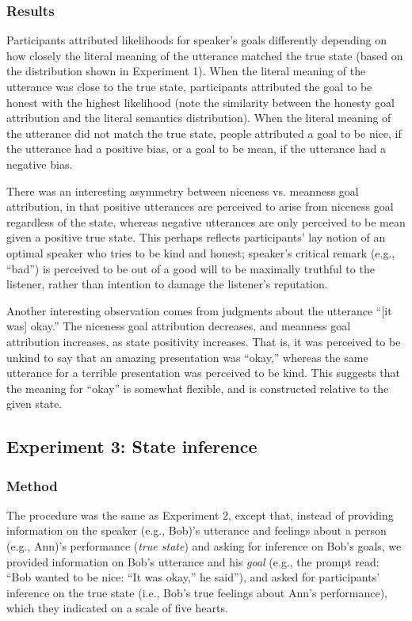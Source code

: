 \documentclass[10pt,letterpaper]{article}
\begin{document}
\subsubsection{Results}

Participants attributed likelihoods for speaker's goals differently depending on how closely the literal meaning of the utterance matched the true state (based on the distribution shown in Experiment 1). When the literal meaning of the utterance was close to the true state, participants attributed the goal to be honest with the highest likelihood (note the similarity between the honesty goal attribution and the literal semantics distribution). When the literal meaning of the utterance did not match the true state, people attributed a goal to be nice, if the utterance had a positive bias, or a goal to be mean, if the utterance had a negative bias.

There was an interesting asymmetry between niceness vs. meanness goal attribution, in that positive utterances are perceived to arise from niceness goal regardless of the state, whereas negative utterances are only perceived to be mean given a positive true state. This perhaps reflects participants' lay notion of an optimal speaker who tries to be kind and honest; speaker's critical remark (e.g., ``bad'') is perceived to be out of a good will to be maximally truthful to the listener, rather than intention to damage the listener's reputation.

Another interesting observation comes from judgments about the utterance ``[it was] okay.'' The niceness goal attribution decreases, and meanness goal attribution increases, as state positivity increases. That is, it was perceived to be unkind to say that an amazing presentation was ``okay,'' whereas the same utterance for a terrible presentation was perceived to be kind. This suggests that the meaning for ``okay'' is somewhat flexible, and is constructed relative to the given state.

\subsection{Experiment 3: State inference}

\subsubsection{Method}

The procedure was the same as Experiment 2, except that, instead of providing information on the speaker (e.g., Bob)'s utterance and feelings about a person (e.g., Ann)'s performance (\emph{true state}) and asking for inference on Bob's goals, we provided information on Bob's utterance and his \emph{goal} (e.g., the prompt read: ``Bob wanted to be nice: ``It was okay,'' he said''), and asked for participants' inference on the true state (i.e., Bob's true feelings about Ann's performance), which they indicated on a scale of five hearts.
\end{document}
